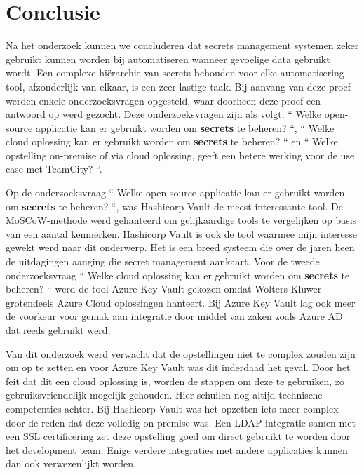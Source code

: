 
\chapter{Conclusie}
\label{ch:conclusie}



Na het onderzoek kunnen we concluderen dat secrets management systemen zeker gebruikt kunnen worden bij automatiseren wanneer gevoelige data gebruikt wordt. Een complexe hiërarchie van secrets behouden voor elke automatisering tool, afzonderlijk van elkaar, is een zeer lastige taak. Bij aanvang van deze proef werden enkele onderzoeksvragen opgesteld, waar doorheen deze proef een antwoord op werd gezocht. Deze onderzoeksvragen zijn als volgt: `` Welke open-source applicatie kan er gebruikt worden om \textbf{secrets} te beheren? ``, `` Welke cloud oplossing kan er gebruikt worden om \textbf{secrets} te beheren? `` en `` Welke opstelling on-premise of via cloud oplossing, geeft een betere werking voor de use case met TeamCity? ``.

Op de onderzoeksvraag `` Welke open-source applicatie kan er gebruikt worden om \textbf{secrets} te beheren? ``, was Hashicorp Vault de meest interessante tool. De MoSCoW-methode werd gehanteerd om gelijkaardige tools te vergelijken op basis van een aantal kenmerken. Hashicorp Vault is ook de tool waarmee mijn interesse gewekt werd naar dit onderwerp. Het is een breed systeem die over de jaren heen de uitdagingen aanging die secret management aankaart. Voor de tweede onderzoeksvraag `` Welke cloud oplossing kan er gebruikt worden om \textbf{secrets} te beheren? `` werd de tool Azure Key Vault gekozen omdat Wolters Kluwer grotendeels Azure Cloud oplossingen hanteert. Bij Azure Key Vault lag ook meer de voorkeur voor gemak aan integratie door middel van zaken zoals Azure AD dat reeds gebruikt werd. 

Van dit onderzoek werd verwacht dat de opstellingen niet te complex zouden zijn om op te zetten en voor Azure Key Vault was dit inderdaad het geval. Door het feit dat dit een cloud oplossing is, worden de stappen om deze te gebruiken, zo gebruiksvriendelijk mogelijk gehouden. Hier schuilen nog altijd technische competenties achter. Bij Hashicorp Vault was het opzetten iets meer complex door de reden dat deze volledig on-premise was. Een LDAP integratie samen met een SSL certificering zet deze opstelling goed om direct gebruikt te worden door het development team. Enige verdere integraties met andere applicaties kunnen dan ook verwezenlijkt worden. 


